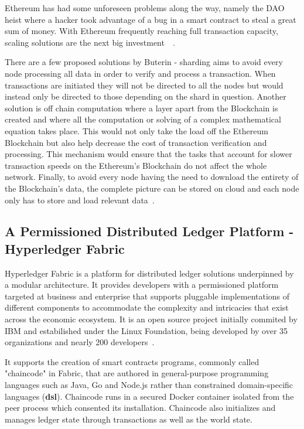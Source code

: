 Ethereum has had some unforeseen problems along the way, namely the DAO heist
where a hacker took advantage of a bug in a smart contract to steal a great sum
of money. With Ethereum frequently reaching full transaction capacity, scaling
solutions are the next big investment~~\cite{ethereumScalability2018}.

There are a few proposed solutions by Buterin - sharding aims to avoid every
node processing all data in order to verify and process a transaction. When
transactions are initiated they will not be directed to all the nodes but
would instead only be directed to those depending on the shard in question.
Another solution is off chain computation where a layer apart from the
Blockchain is created and where all the computation or solving of a complex
mathematical equation takes place. This would not only take the load off the
Ethereum Blockchain but also help decrease the cost of transaction
verification and processing. This mechanism would ensure that the tasks that
account for slower transaction speeds on the Ethereum’s Blockchain do not
affect the whole network. Finally, to avoid every node having the need to
download the entirety of the Blockchain's data, the complete picture can be
stored on cloud and each node only has to store and load relevant
data~\cite{ethereumBlogScalability2018}.

\subsection{A Permissioned Distributed Ledger Platform - Hyperledger Fabric}

Hyperledger Fabric is a platform for distributed ledger solutions underpinned
by a modular architecture. It provides developers with a permissioned platform
targeted at business and enterprise that supports pluggable implementations of
different components to accommodate the complexity and intricacies that exist
across the economic ecosystem. It is an open source project initially commited
by IBM  and estabilished under the Linux Foundation, being developed by over 35
organizations and nearly 200 developers~\cite{HyperledgerFabricDocs2017}.

It supports the creation of smart contracts programs, commonly called
"chaincode" in Fabric, that are authored in general-purpose programming
languages such as Java, Go and Node.js rather than constrained domain-specific
languages (\textbf{dsl}). Chaincode runs in a secured Docker container isolated
from the peer process which consented its installation. Chaincode also
initializes and manages ledger state through transactions as well as the world
state.

